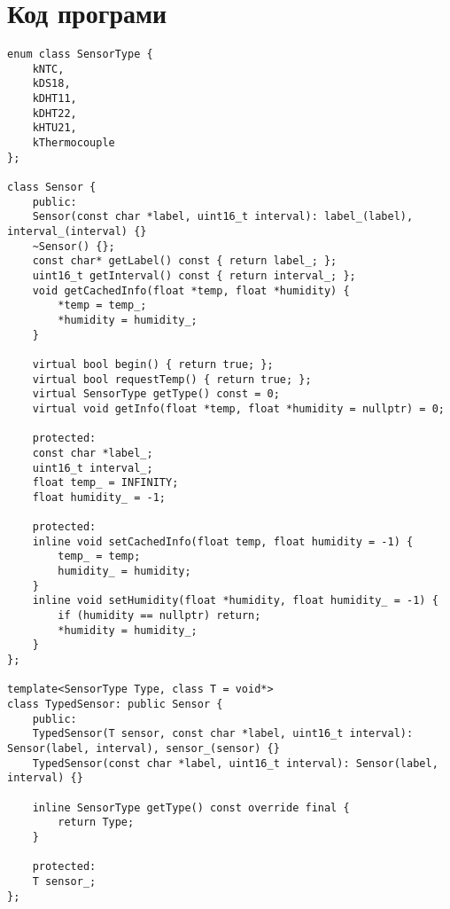 
\chapter{Код програми}
\thispagestyle{headings}

\begin{lstlisting}[style=cpp-small, caption=Базовий клас температурного датчика, label=lst:sensor_base]
enum class SensorType {
    kNTC,
    kDS18,
    kDHT11,
    kDHT22,
    kHTU21,
    kThermocouple
};

class Sensor {
    public:
    Sensor(const char *label, uint16_t interval): label_(label), interval_(interval) {}
    ~Sensor() {};
    const char* getLabel() const { return label_; };
    uint16_t getInterval() const { return interval_; };
    void getCachedInfo(float *temp, float *humidity) {
        *temp = temp_;
        *humidity = humidity_;
    }

    virtual bool begin() { return true; };
    virtual bool requestTemp() { return true; };
    virtual SensorType getType() const = 0;
    virtual void getInfo(float *temp, float *humidity = nullptr) = 0;

    protected:
    const char *label_;
    uint16_t interval_;
    float temp_ = INFINITY;
    float humidity_ = -1;

    protected:
    inline void setCachedInfo(float temp, float humidity = -1) {
        temp_ = temp;
        humidity_ = humidity;
    }
    inline void setHumidity(float *humidity, float humidity_ = -1) {
        if (humidity == nullptr) return;
        *humidity = humidity_;
    }
};

template<SensorType Type, class T = void*>
class TypedSensor: public Sensor {
    public:
    TypedSensor(T sensor, const char *label, uint16_t interval): Sensor(label, interval), sensor_(sensor) {}
    TypedSensor(const char *label, uint16_t interval): Sensor(label, interval) {}

    inline SensorType getType() const override final {
        return Type;
    }

    protected:
    T sensor_;
};
\end{lstlisting}

